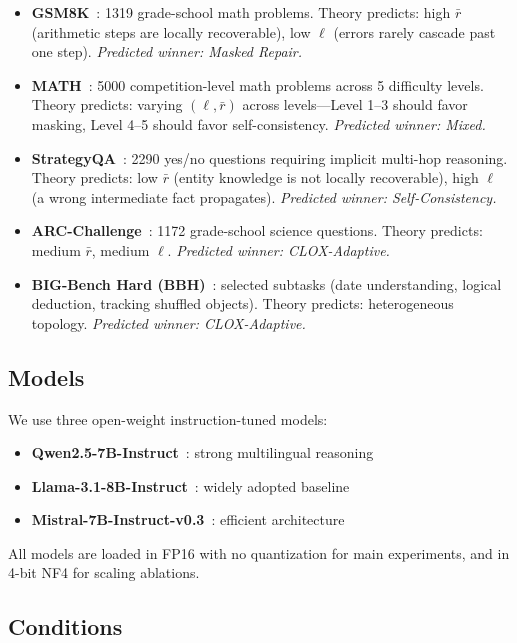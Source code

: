 \documentclass{article}
\begin{document}
\begin{itemize}[nosep, leftmargin=*]
\item \textbf{GSM8K}~\citep{cobbe2021gsm8k}: 1319 grade-school math problems. Theory predicts: high $\bar{r}$ (arithmetic steps are locally recoverable), low $\ell$ (errors rarely cascade past one step). \emph{Predicted winner: Masked Repair.}
\item \textbf{MATH}~\citep{hendrycks2021math}: 5000 competition-level math problems across 5 difficulty levels. Theory predicts: varying $(\ell, \bar{r})$ across levels---Level 1--3 should favor masking, Level 4--5 should favor self-consistency. \emph{Predicted winner: Mixed.}
\item \textbf{StrategyQA}~\citep{geva2021strategyqa}: 2290 yes/no questions requiring implicit multi-hop reasoning. Theory predicts: low $\bar{r}$ (entity knowledge is not locally recoverable), high $\ell$ (a wrong intermediate fact propagates). \emph{Predicted winner: Self-Consistency.}
\item \textbf{ARC-Challenge}~\citep{clark2018arc}: 1172 grade-school science questions. Theory predicts: medium $\bar{r}$, medium $\ell$. \emph{Predicted winner: CLOX-Adaptive.}
\item \textbf{BIG-Bench Hard (BBH)}~\citep{suzgun2023bbh}: selected subtasks (date understanding, logical deduction, tracking shuffled objects). Theory predicts: heterogeneous topology. \emph{Predicted winner: CLOX-Adaptive.}
\end{itemize}

\subsection{Models}

We use three open-weight instruction-tuned models:
\begin{itemize}[nosep, leftmargin=*]
\item \textbf{Qwen2.5-7B-Instruct}~\citep{qwen2024qwen25}: strong multilingual reasoning
\item \textbf{Llama-3.1-8B-Instruct}~\citep{dubey2024llama3}: widely adopted baseline
\item \textbf{Mistral-7B-Instruct-v0.3}~\citep{jiang2023mistral}: efficient architecture
\end{itemize}

All models are loaded in FP16 with no quantization for main experiments, and in 4-bit NF4 for scaling ablations.

\subsection{Conditions}
\end{document}
